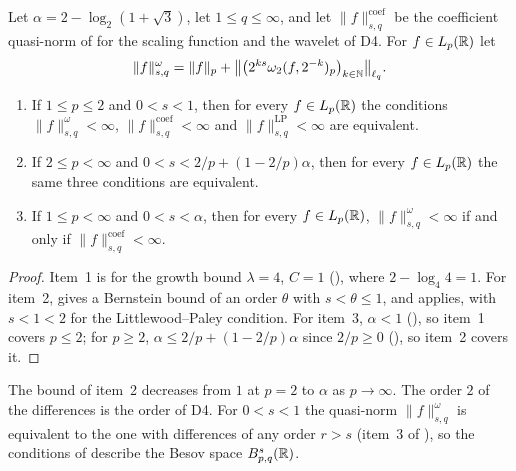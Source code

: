 \begin{theorem}
\label{thm:daub-besov-d4}
\leanok
{}
Let $\alpha = 2 - \log_2(1 + \sqrt 3)$, let $1 \leq q \leq \infty$, and let
$\|f\|^{\mathrm{coef}}_{s,q}$ be the coefficient quasi-norm of  for the
scaling function and the wavelet of D4. For $f \in L_p(\mathbb{R})$ let
\[
  \|f\|^{\omega}_{s,q} = \|f\|_p
  + \bigl\|\bigl(2^{ks} \omega_2(f, 2^{-k})_p\bigr)_{k \in \mathbb{N}}\bigr\|_{\ell_q} .
\]
\begin{enumerate}
  \item If $1 \leq p \leq 2$ and $0 < s < 1$, then for every $f \in L_p(\mathbb{R})$ the conditions
    $\|f\|^{\omega}_{s,q} < \infty$, $\|f\|^{\mathrm{coef}}_{s,q} < \infty$ and
    $\|f\|^{\mathrm{LP}}_{s,q} < \infty$ are equivalent.
  \item If $2 \leq p < \infty$ and $0 < s < 2/p + (1 - 2/p) \alpha$, then for every
    $f \in L_p(\mathbb{R})$ the same three conditions are equivalent.
  \item If $1 \leq p < \infty$ and $0 < s < \alpha$, then for every $f \in L_p(\mathbb{R})$,
    $\|f\|^{\omega}_{s,q} < \infty$ if and only if $\|f\|^{\mathrm{coef}}_{s,q} < \infty$.
\end{enumerate}
\end{theorem}

\begin{proof}
\leanok
{}
Item~1 is  for the growth bound $\lambda = 4$, $C = 1$
(), where $2 - \log_4 4 = 1$. For item~2,
 gives a Bernstein bound of an order $\theta$ with
$s < \theta \leq 1$, and  applies, with $s < 1 < 2$ for the
Littlewood--Paley condition. For item~3, $\alpha < 1$ (), so item~1
covers $p \leq 2$; for $p \geq 2$, $\alpha \leq 2/p + (1 - 2/p) \alpha$ since $2/p \geq 0$
(), so item~2 covers it.
\end{proof}

The bound of item~2 decreases from $1$ at $p = 2$ to $\alpha$ as $p \to \infty$. The order $2$
of the differences is the order of D4. For $0 < s < 1$ the quasi-norm $\|f\|^{\omega}_{s,q}$ is
equivalent to the one with differences of any order $r > s$ (item~3 of ),
so the conditions of  describe the Besov space $B^{s}_{p,q}(\mathbb{R})$.

